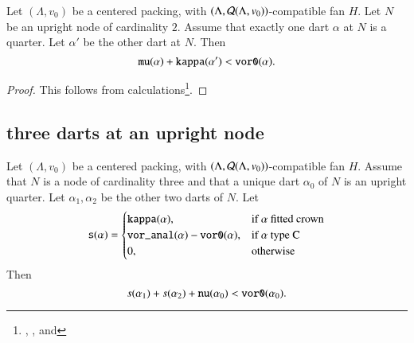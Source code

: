 \begin{lemma}\label{a:context11} %
Let $(\Lambda,v_0)$ be a centered packing, 
with $(\Lambda,{\mathcal Q}(\Lambda,v_0))$-compatible fan $H$.  
Let $N$ be an upright node
of cardinality $2$.  Assume that exactly one dart $\alpha$ 
at $N$ is a quarter.  Let $\alpha'$ be the other dart at $N$.
Then
 $$
 {\operatorname{{\texttt{mu}}}}(\alpha) + {\operatorname{{\texttt{kappa}}}}(\alpha') < {\operatorname{{\texttt{vor0}}}}(\alpha).
 $$
\end{lemma}

\begin{proof}
This follows from
calculations\footnote{, , and
}.
\end{proof}

\subsection{three darts at an upright node}


\begin{lemma}
Let $(\Lambda,v_0)$ be a centered packing, 
with $(\Lambda,{\mathcal Q}(\Lambda,v_0))$-compatible fan $H$.
Assume that $N$ is a node
of cardinality three and that a unique dart $\alpha_0$  of $N$
is an upright quarter.  Let $\alpha_1,\alpha_2$ be the other
two darts of $N$.
Let 
  $${\operatorname{{\texttt{s}}}}(\alpha)=\begin{cases}
  {\operatorname{{\texttt{kappa}}}}(\alpha),&\text{if $\alpha$ fitted crown}\\
  {\operatorname{{\texttt{vor\_anal}}}}(\alpha)-{\operatorname{{\texttt{vor0}}}}(\alpha),&\text{if $\alpha$ type C}\\
  0,&\text{otherwise}
  \end{cases}
  $$
Then 
  $$
  s(\alpha_1) + s(\alpha_2) + {\operatorname{{\texttt{nu}}}}(\alpha_0) < {\operatorname{{\texttt{vor0}}}}(\alpha_0).
  $$
\end{lemma}


